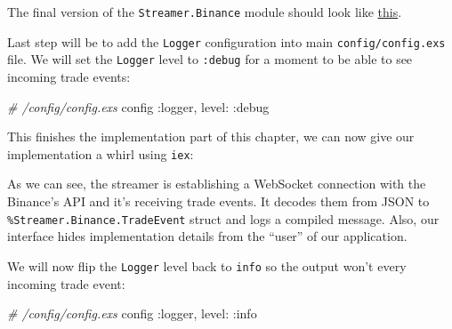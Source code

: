 \documentclass[
]{book}
\newenvironment{Shaded}{\begin{snugshade}}{\end{snugshade}}
\newcommand{\AttributeTok}[1]{\textcolor[rgb]{0.77,0.63,0.00}{#1}}
\newcommand{\CommentTok}[1]{\textcolor[rgb]{0.56,0.35,0.01}{\textit{#1}}}
\newcommand{\ErrorTok}[1]{\textcolor[rgb]{0.64,0.00,0.00}{\textbf{#1}}}
\newcommand{\ExtensionTok}[1]{#1}
\newcommand{\KeywordTok}[1]{\textcolor[rgb]{0.13,0.29,0.53}{\textbf{#1}}}
\newcommand{\NormalTok}[1]{#1}
\newcommand{\OperatorTok}[1]{\textcolor[rgb]{0.81,0.36,0.00}{\textbf{#1}}}
\newcommand{\StringTok}[1]{\textcolor[rgb]{0.31,0.60,0.02}{#1}}
\newcommand{\VariableTok}[1]{\textcolor[rgb]{0.00,0.00,0.00}{#1}}
\begin{document}
The final version of the \texttt{Streamer.Binance} module should look like \href{https://github.com/frathon/create-a-cryptocurrency-trading-bot-in-elixir-source-code/blob/chapter_01/apps/streamer/lib/streamer/binance.ex}{this}.

Last step will be to add the \texttt{Logger} configuration into main \texttt{config/config.exs} file. We will set the \texttt{Logger} level to \texttt{:debug} for a moment to be able to see incoming trade events:

\begin{Shaded}
\begin{Highlighting}[]
\CommentTok{\# /config/config.exs}
\NormalTok{config }\VariableTok{:logger}\NormalTok{,}
  \VariableTok{level:} \VariableTok{:debug}
\end{Highlighting}
\end{Shaded}

This finishes the implementation part of this chapter, we can now give our implementation a whirl using \texttt{iex}:

\begin{Shaded}
\end{Shaded}

As we can see, the streamer is establishing a WebSocket connection with the Binance's API and it's receiving trade events. It decodes them from JSON to \texttt{\%Streamer.Binance.TradeEvent} struct and logs a compiled message. Also, our interface hides implementation details from the ``user'' of our application.

We will now flip the \texttt{Logger} level back to \texttt{info} so the output won't every incoming trade event:

\begin{Shaded}
\begin{Highlighting}[]
\CommentTok{\# /config/config.exs}
\NormalTok{config }\VariableTok{:logger}\NormalTok{,}
  \VariableTok{level:} \VariableTok{:info}
\end{Highlighting}
\end{Shaded}
\end{document}
